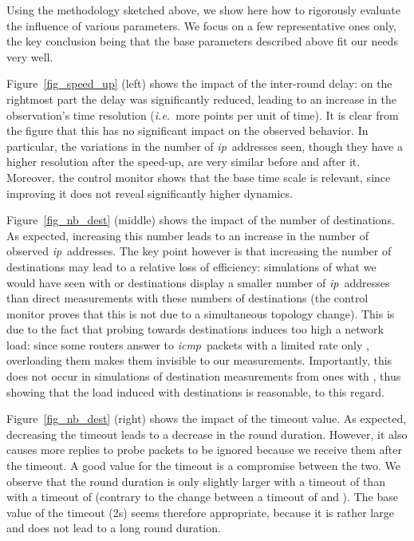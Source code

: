 \documentclass[times, 10pt,twocolumn]{article}
\newcommand{\ie}{{\em i.e.}}
\newcommand{\ip}{\mbox{\em \sc ip}}
\newcommand{\icmp}{{\em \sc icmp}}
\begin{document}
Using the methodology sketched above, we show here how to rigorously evaluate the influence of various parameters. We focus on a few representative ones only, the key conclusion being that the base parameters described above fit our needs very well.

Figure~\ref{fig_speed_up} (left) shows the impact of the inter-round delay: on the rightmost part the delay was significantly reduced, leading to an increase in the observation's time resolution (\ie\ more points per unit of time). It is clear from the figure that this has no significant impact on the observed behavior. In particular, the variations in the number of \ip\ addresses seen, though they have a higher resolution after the speed-up, are very similar before and after it. Moreover, the control monitor shows that the base time scale is relevant, since improving it does not reveal significantly higher dynamics.

Figure~\ref{fig_nb_dest} (middle) shows the impact of the number of
destinations. As expected, increasing this number leads to an increase
in the number of observed \ip\ addresses.
The key point however is that increasing
the number of destinations may lead to a relative loss of efficiency:
simulations of what we would have seen with  or 
destinations display a smaller number of \ip\ addresses than direct
measurements with these numbers of destinations (the control monitor
proves that this is not due to a simultaneous topology change). This
is due to the fact that probing towards  destinations induces
too high a network load: since some routers answer to \icmp\ packets
with a limited rate only \cite{govindan2002estimating}, overloading
them makes them invisible to our measurements. Importantly, this does
not occur in simulations of  destination measurements from
ones with , thus showing that the load induced with 
destinations is reasonable, to this regard.

Figure~\ref{fig_nb_dest} (right) shows the impact of the timeout value.
As expected, decreasing the timeout leads to a decrease in the round
duration.
However, it also causes more replies to probe packets to be ignored because we receive them after the timeout.
A good value for the timeout is a compromise
between the two. We observe that the round duration is only slightly
larger with a timeout of  than with a timeout of  (contrary to
the change between a timeout of  and ).  The base value of the
timeout (2s) seems therefore appropriate, because it is rather large
and does not lead to a long round duration.
\end{document}
